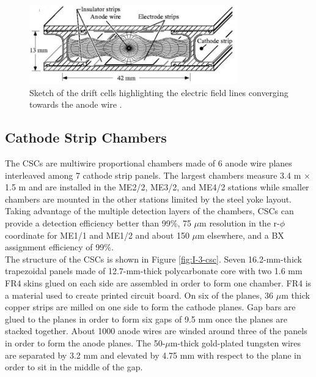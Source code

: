      \begin{figure}[h!]
        \centering
        \includegraphics[width=0.8\textwidth]{img/I-3-cms/dt.jpg}
        \caption{Sketch of the drift cells highlighting the electric field lines converging towards the anode wire \cite{1748-0221-3-08-S08004}.}
        \label{fig:I-3-dt}
      \end{figure}

  	\subsection{Cathode Strip Chambers}

      The CSCs are multiwire proportional chambers made of 6 anode wire planes interleaved among 7 cathode strip panels. The largest chambers measure 3.4 m $ \times $ 1.5 m and are installed in the ME2/2, ME3/2, and ME4/2 stations while smaller chambers are mounted in the other stations limited by the steel yoke layout. Taking advantage of the multiple detection layers of the chambers, CSCs can provide a detection efficiency better than 99\%, 75 $\mu$m resolution in the r-$\phi$ coordinate for ME1/1 and ME1/2 and about 150 $\mu$m elsewhere, and a BX assignment efficiency of 99\%. \\

      The structure of the CSCs is shown in Figure \ref{fig:I-3-csc}. Seven 16.2-mm-thick trapezoidal panels made of 12.7-mm-thick polycarbonate core with two 1.6 mm FR4 skins glued on each side are assembled in order to form one chamber. FR4 is a material used to create printed circuit board. On six of the planes, 36 $\mu$m thick copper strips are milled on one side to form the cathode planes. Gap bars are glued to the planes in order to form six gaps of 9.5 mm once the planes are stacked together. About 1000 anode wires are winded around three of the panels in order to form the anode planes. The 50-$\mu$m-thick gold-plated tungsten wires are separated by 3.2 mm and elevated by 4.75 mm with respect to the plane in order to sit in the middle of the gap.


